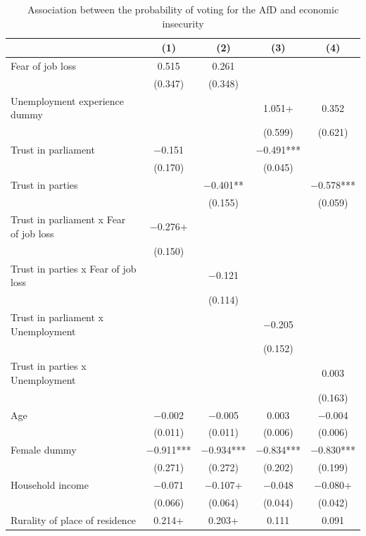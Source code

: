 \documentclass[
]{article}
\begin{document}
\begin{table}[!h]

\caption{\label{tab:regression-results-1-table2}Association between the probability of voting for the AfD and economic insecurity}
\centering
\begin{tabular}[t]{lcccc}
\toprule
  & (1) & (2) & (3) & (4)\\
\midrule
Fear of job loss & \num{0.515} & \num{0.261} &  & \\
 & (\num{0.347}) & (\num{0.348}) &  & \\
Unemployment experience dummy &  &  & \num{1.051}+ & \num{0.352}\\
 &  &  & (\num{0.599}) & (\num{0.621})\\
Trust in parliament & \num{-0.151} &  & \num{-0.491}*** & \\
 & (\num{0.170}) &  & (\num{0.045}) & \\
Trust in parties &  & \num{-0.401}** &  & \num{-0.578}***\\
 &  & (\num{0.155}) &  & (\num{0.059})\\
Trust in parliament
x Fear of job loss & \num{-0.276}+ &  &  & \\
 & (\num{0.150}) &  &  & \\
Trust in parties
x Fear of job loss &  & \num{-0.121} &  & \\
 &  & (\num{0.114}) &  & \\
Trust in parliament
x Unemployment &  &  & \num{-0.205} & \\
 &  &  & (\num{0.152}) & \\
Trust in parties
x Unemployment &  &  &  & \num{0.003}\\
 &  &  &  & (\num{0.163})\\
Age & \num{-0.002} & \num{-0.005} & \num{0.003} & \num{-0.004}\\
 & (\num{0.011}) & (\num{0.011}) & (\num{0.006}) & (\num{0.006})\\
Female dummy & \num{-0.911}*** & \num{-0.934}*** & \num{-0.834}*** & \num{-0.830}***\\
 & (\num{0.271}) & (\num{0.272}) & (\num{0.202}) & (\num{0.199})\\
Household income & \num{-0.071} & \num{-0.107}+ & \num{-0.048} & \num{-0.080}+\\
 & (\num{0.066}) & (\num{0.064}) & (\num{0.044}) & (\num{0.042})\\
Rurality of place
of residence & \num{0.214}+ & \num{0.203}+ & \num{0.111} & \num{0.091}\\

\end{tabular}
\end{table}
\end{document}
